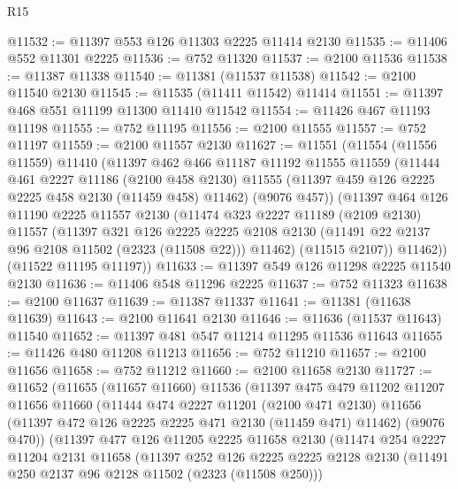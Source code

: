 \begin{lexlean}{R15}
\begin{coremodule}
@11532 := @11397 @553 @126 @11303 @2225 @11414 @2130
@11535 := @11406 @552 @11301 @2225
@11536 := @752 @11320
@11537 := @2100 @11536
@11538 := @11387 @11338
@11540 := @11381 (@11537 @11538)
@11542 := @2100 @11540 @2130
@11545 := @11535 (@11411 @11542) @11414
@11551 := @11397 @468 @551 @11199 @11300 @11410 @11542
@11554 := @11426 @467 @11193 @11198
@11555 := @752 @11195
@11556 := @2100 @11555
@11557 := @752 @11197
@11559 := @2100 @11557 @2130
@11627 := @11551
    (@11554
      (@11556 @11559)
      @11410
      (@11397
        @462
        @466
        @11187
        @11192
        @11555
        @11559
        (@11444
          @461
          @2227
          @11186
          (@2100 @458 @2130)
          @11555
          (@11397 @459 @126 @2225 @2225 @458 @2130 (@11459 @458) @11462)
          (@9076 @457))
        (@11397
          @464
          @126
          @11190
          @2225
          @11557
          @2130
          (@11474
            @323
            @2227
            @11189
            (@2109 @2130)
            @11557
            (@11397
              @321
              @126
              @2225
              @2225
              @2108
              @2130
              (@11491 @22 @2137 @96 @2108 @11502 (@2323 (@11508 @22)))
              @11462)
            (@11515 @2107))
          @11462))
      (@11522 @11195 @11197))
@11633 := @11397 @549 @126 @11298 @2225 @11540 @2130
@11636 := @11406 @548 @11296 @2225
@11637 := @752 @11323
@11638 := @2100 @11637
@11639 := @11387 @11337
@11641 := @11381 (@11638 @11639)
@11643 := @2100 @11641 @2130
@11646 := @11636 (@11537 @11643) @11540
@11652 := @11397 @481 @547 @11214 @11295 @11536 @11643
@11655 := @11426 @480 @11208 @11213
@11656 := @752 @11210
@11657 := @2100 @11656
@11658 := @752 @11212
@11660 := @2100 @11658 @2130
@11727 := @11652
    (@11655
      (@11657 @11660)
      @11536
      (@11397
        @475
        @479
        @11202
        @11207
        @11656
        @11660
        (@11444
          @474
          @2227
          @11201
          (@2100 @471 @2130)
          @11656
          (@11397 @472 @126 @2225 @2225 @471 @2130 (@11459 @471) @11462)
          (@9076 @470))
        (@11397
          @477
          @126
          @11205
          @2225
          @11658
          @2130
          (@11474
            @254
            @2227
            @11204
            @2131
            @11658
            (@11397
              @252
              @126
              @2225
              @2225
              @2128
              @2130
              (@11491 @250 @2137 @96 @2128 @11502 (@2323 (@11508 @250)))

\end{coremodule}
\end{lexlean}
